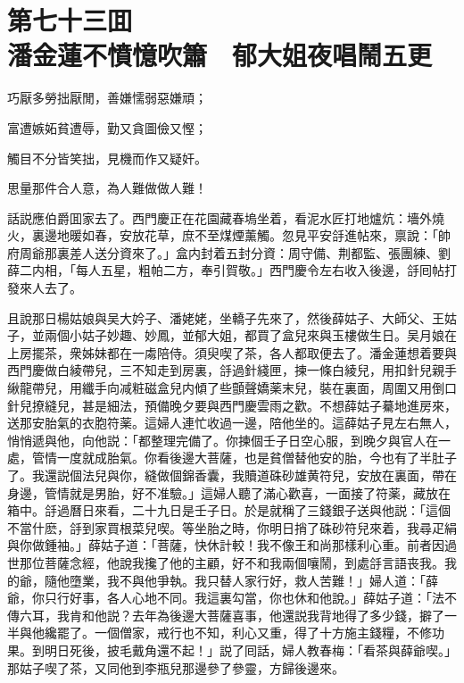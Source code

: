 
\chapter*{第七十三囬　\\潘金蓮不憤憶吹簫　郁大姐夜唱鬧五更}


\begin{myquote}
巧厭多勞拙厭閒，善嫌懦弱惡嫌頑；

富遭嫉妬貧遭辱，勤又貪圖儉又慳；

觸目不分皆笑拙，見機而作又疑奸。

思量那件合人意，為人難做做人難！
\end{myquote}

話説應伯爵囬家去了。西門慶正在花園藏春塢坐着，看泥水匠打地爐炕：墻外燒火，裏邊地暖如春，安放花草，庶不至煤煙薰觸。忽見平安㧱進帖來，禀說：「帥府周爺那裏差人送分資來了。」盒内封着五封分資：周守備、荆都監、張團練、劉薛二内相，「每人五星，粗帕二方，奉引賀敬。」西門慶令左右收入後邊，㧱囘帖打發來人去了。

且說那日楊姑娘與吴大妗子、潘姥姥，坐轎子先來了，然後薛姑子、大師父、王姑子，並兩個小姑子妙趣、妙鳳，並郁大姐，都買了盒兒來與玉樓做生日。吴月娘在上房擺茶，衆姊妹都在一䖏陪侍。須臾喫了茶，各人都取便去了。潘金蓮想着要與西門慶做白綾帶兒，三不知走到房裏，㧱過針綫匣，揀一條白綾兒，用扣針兒親手䋺龍帶兒，用纖手向减粧磁盒兒内傾了些顫聲嬌薬末兒，裝在裏面，周圍又用倒口針兒撩縫兒，甚是細法，預備晚夕要與西門慶雲雨之歡。不想薛姑子驀地進房來，送那安胎氣的衣胞符薬。這婦人連忙收過一邊，陪他坐的。這薛姑子見左右無人，悄悄遞與他，向他説：「都整理完備了。你揀個壬子日空心服，到晚夕與官人在一處，管情一度就成胎氣。你看後邊大菩薩，也是貧僧替他安的胎，今也有了半肚子了。我還説個法兒與你，縫做個錦香囊，我贖道硃砂雄黄符兒，安放在裏面，帶在身邊，管情就是男胎，好不准驗。」這婦人聽了滿心歡喜，一面接了符薬，藏放在箱中。㧱過曆日來看，二十九日是壬子日。於是就稱了三錢銀子送與他説：「這個不當什麽，㧱到家買根菜兒喫。等坐胎之時，你明日捎了硃砂符兒來着，我尋疋絹與你做鍾袖。」薛姑子道：「菩薩，快休計較！我不像王和尚那樣利心重。前者因過世那位菩薩念經，他說我攙了他的主顧，好不和我兩個嚷鬧，到處㧱言語丧我。我的爺，隨他墮業，我不與他爭執。我只替人家行好，救人苦難！」婦人道：「薛爺，你只行好事，各人心地不同。我這裏勾當，你也休和他說。」薛姑子道：「法不傳六耳，我肯和他説？去年為後邊大菩薩喜事，他還説我背地得了多少錢，擗了一半與他纔罷了。一個僧家，戒行也不知，利心又重，得了十方施主錢糧，不修功果。到明日死後，披毛戴角還不起！」説了囘話，婦人教春梅：「看茶與薛爺喫。」那姑子喫了茶，又同他到李瓶兒那邊參了參靈，方歸後邊來。


